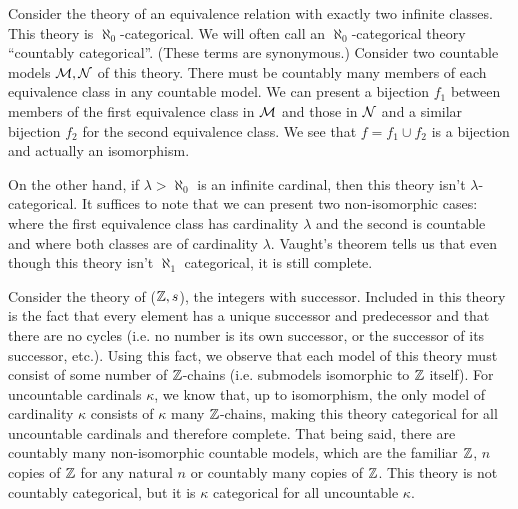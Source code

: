 \begin{example}\label{example_categoricity_equiv}
Consider the theory of an equivalence relation with exactly two infinite classes. 
This theory is \(\aleph_0\)-categorical.
We will often call an \(\aleph_0\)-categorical theory ``countably categorical''.
(These terms are synonymous.)  
Consider two countable models \(\mathcal{M}, \mathcal{N}\) of this theory. 
There must be countably many members of each equivalence class in any countable model. 
We can present a bijection \(f_1\) between members of the first equivalence class in  \(\mathcal{M}\) and those in \(\mathcal{N}\) and a similar bijection \(f_2\) for the second equivalence class. 
We see that \(f = f_1 \cup f_2\) is a bijection and actually an isomorphism. 

On the other hand, if \(\lambda > \aleph_0\) is an infinite cardinal, then this theory isn't \(\lambda\)-categorical. 
It suffices to note that we can present two non-isomorphic cases: where the first equivalence class has cardinality \(\lambda\) and the second is countable and where both classes are of cardinality \(\lambda\). 
Vaught's theorem tells us that even though this theory isn't \(\aleph_1\) categorical, it is still complete. 
\end{example}

\begin{example}\label{example_categoricity_integers}
Consider the theory of (\(\mathbb{Z}, s\)), the integers with successor. 
Included in this theory is the fact that every element has a unique successor and predecessor and that there are no cycles (i.e. no number is its own successor, or the successor of its successor, etc.). 
Using this fact, we observe that each model of this theory must consist of some number of \(\mathbb{Z}\)-chains (i.e. submodels isomorphic to \(\mathbb{Z}\) itself). 
For uncountable cardinals \(\kappa\), we know that, up to isomorphism, the only model of cardinality \(\kappa\) consists of \(\kappa\) many \(\mathbb{Z}\)-chains,
making this theory categorical for all uncountable cardinals and therefore complete. 
That being said, there are countably many non-isomorphic countable models, which are the familiar \(\mathbb{Z}\), \(n\) copies of \(\mathbb{Z}\) for any natural \(n\) or countably many copies of \(\mathbb{Z}\). 
This theory is not countably categorical, but it is \(\kappa\) categorical for all uncountable \(\kappa\). 
\end{example}

